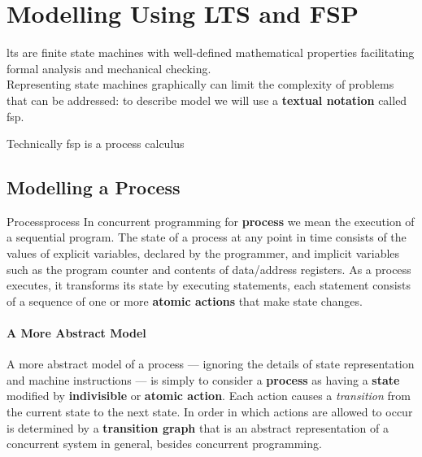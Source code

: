 \section{Modelling Using LTS and FSP}\label{sec:md_modelling_using_lts_and_fsp} %
\acl{lts} are finite state machines with well-defined mathematical properties facilitating formal analysis and mechanical checking.
\\
Representing state machines graphically can limit the complexity of problems that can be addressed: to describe model we will use a \textbf{textual notation} called \ac{fsp}.
\begin{note}
    Technically \ac{fsp} is a process calculus
\end{note}
%
\subsection{Modelling a Process}\label{sub:md_modelling_a_process} %
\begin{definition}{Process}{process}
    In concurrent programming for \textbf{process} we mean the execution of a sequential program.
    The state of a process at any point in time consists of the values of explicit variables, declared by the programmer, and implicit variables such as the program counter and contents of data/address registers.
    \emptyln{}
    As a process executes, it transforms its state by executing statements, each statement consists of a sequence of one or more \textbf{atomic actions} that make  state changes.
\end{definition}
\paragraph{A More Abstract Model}\label{par:process_a_more_abstract_model} %
A more abstract model of a process --- ignoring the details of state representation and machine instructions --- is simply to consider a \textbf{process} as having a \textbf{state} modified by \textbf{indivisible} or \textbf{atomic action}.
Each action causes a \textit{transition} from the current state to the next state.
In order in which actions are allowed to occur is determined by a \textbf{transition graph} that is an abstract representation of a concurrent system in general, besides concurrent programming.
%
